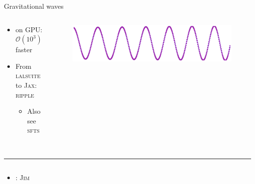 \documentclass[usenames,dvipsnames,t]{beamer}
\newcommand{\ghlink}[1]{\href{https://github.com/#1}{\textcolor{black}{\faGithub}}}
\begin{document}
\begin{frame}{Gravitational waves}
  \def\x{3mm}
  \def\y{5mm}
  \def\z{1mm}

  \vspace{-3mm}
  
  \begin{columns}
    \begin{column}[t]{0.62\linewidth}
      \begin{itemize}
        \item {} on GPU: $\mathcal{O}(10^3)$ faster

        \vspace{\x}
        
        \item From \textsc{lalsuite} to \textsc{Jax}: \textsc{ripple}~\ghlink{tedwards2412/ripple/}~\cite{Edwards:2023sak}
        \begin{itemize}
          \item Also see \textsc{sfts}~\ghlink{rodrigo-tenorio/sfts}~\cite{Tenorio:2025gci}
        \end{itemize}
      \end{itemize}
    \end{column}

    \begin{column}[t]{0.36\linewidth}
      \begin{figure}
        \centering
        \includegraphics[width=0.99\linewidth]{Figures/strain_zoomed.pdf}
      \end{figure}
    \end{column}
  \end{columns}

  \pause

  \vspace{5mm}
  \hrule
  \vspace{2.5mm}

  \begin{columns}
    \begin{column}[t]{0.60\linewidth}
      \begin{itemize}
        \item {}: \textsc{Jim}~\ghlink{kazewong/jim}~\cite{Wong:2023lgb,Wouters:2024oxj}
    

\end{itemize}
\end{column}
\end{columns}
\end{frame}
\end{document}
